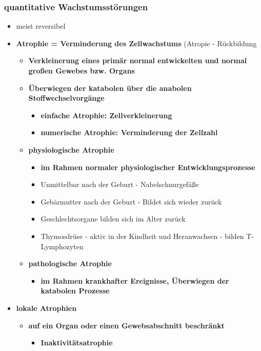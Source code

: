 \subsubsection{quantitative Wachstumsstörungen}
	\begin{itemize}
		\item meist reversibel
		\item \textbf{Atrophie = Verminderung des Zellwachstums} (Atropie - Rückbildung
			\begin{itemize}
				\item \textbf{Verkleinerung eines primär normal entwickelten und normal großen Gewebes bzw. Organs}
				\item \textbf{Überwiegen der katabolen über die anabolen Stoffwechselvorgänge}
					\begin{itemize}
						\item \textbf{einfache Atrophie: Zellverkleinerung}
						\item \textbf{numerische Atrophie: Verminderung der Zellzahl}
					\end{itemize}
				\item \textbf{physiologische Atrophie}
					\begin{itemize}
						\item \textbf{im Rahmen normaler physiologischer Entwicklungsprozesse}
						\item Unmittelbar nach der Geburt - Nabelschnurgefäße
						\item Gebärmutter nach der Geburt - Bildet sich wieder zurück
						\item Geschlechtsorgane bilden sich im Alter zurück
						\item Thymosdrüse - aktiv in der Kindheit und Heranwachsen - bilden T-Lymphozyten
					\end{itemize}
				\item \textbf{pathologische Atrophie}
					\begin{itemize}
						\item \textbf{im Rahmen krankhafter Ereignisse, Überwiegen der katabolen Prozesse}
					\end{itemize}
			\end{itemize}
\pagebreak
		\item \textbf{lokale Atrophien}
			\begin{itemize}
				\item \textbf{auf ein Organ oder einen Gewebsabschnitt beschränkt}
					\begin{itemize}
						\item \textbf{Inaktivitätsatrophie}

\end{itemize}
\end{itemize}
\end{itemize}
